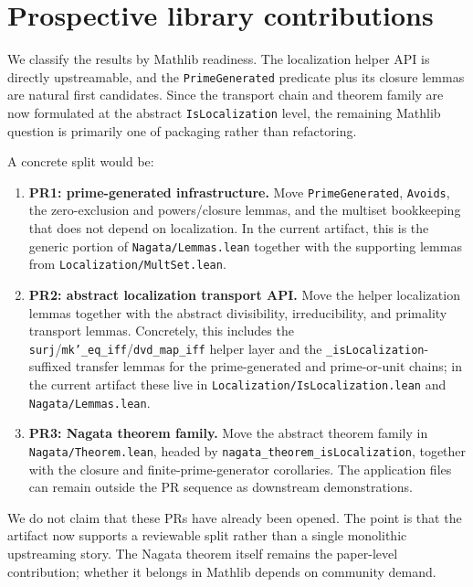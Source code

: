 \documentclass[11pt]{article}
\theoremstyle{plain}
\theoremstyle{definition}
\theoremstyle{remark}
\newcommand{\li}[1]{\texorpdfstring{\texttt{#1}}{#1}}
\newcommand{\lf}[1]{\texorpdfstring{\nolinkurl{#1}}{#1}}
\begin{document}
\section{Prospective library contributions}\label{sec:upstream}

We classify the results by Mathlib readiness.  The localization helper API is
directly upstreamable, and the \li{PrimeGenerated} predicate plus its closure lemmas are natural first
candidates.  Since the transport chain and theorem family are now formulated at
the abstract \li{IsLocalization} level, the remaining Mathlib question is
primarily one of packaging rather than refactoring.

A concrete split would be:
\begin{enumerate}[nosep]
\item \textbf{PR1: prime-generated infrastructure.}  Move
  \li{PrimeGenerated}, \li{Avoids}, the zero-exclusion and powers/closure
  lemmas, and the multiset bookkeeping that does not depend on localization.
  In the current artifact, this is the generic portion of
  \lf{Nagata/Lemmas.lean} together with the supporting lemmas from
  \lf{Localization/MultSet.lean}.
\item \textbf{PR2: abstract localization transport API.}  Move the helper
  localization lemmas together with the abstract divisibility,
  irreducibility, and primality transport lemmas.  Concretely, this includes
  the \li{surj}/\li{mk'\_eq\_iff}/\li{dvd\_map\_iff} helper layer and the
  \li{\_isLocalization}-suffixed transfer lemmas for the prime-generated and
  prime-or-unit chains; in the current artifact these live in
  \lf{Localization/IsLocalization.lean} and \lf{Nagata/Lemmas.lean}.
\item \textbf{PR3: Nagata theorem family.}  Move the abstract theorem family in
  \lf{Nagata/Theorem.lean}, headed by
  \li{nagata\_theorem\_isLocalization}, together with the closure and
  finite-prime-generator corollaries.  The application files can remain outside
  the PR sequence as downstream demonstrations.
\end{enumerate}

\noindent
We do not claim that these PRs have already been opened.  The point is that the
artifact now supports a reviewable split rather than a single monolithic
upstreaming story.  The Nagata theorem itself remains the paper-level
contribution; whether it belongs in Mathlib depends on community demand.
\end{document}
